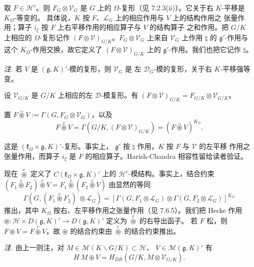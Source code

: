 取 $F\in\mathcal{H}^c$。则 $F_G\otimes\mathcal{V}_G$ 是 $G$ 上的
$\Omega$-复形（见 7.2.3(ii)）。它关于右 $K$-平移是 $K_\Omega$-等变的。
具体说，$K$ 按 $F$、$\mathcal{L}_G$ 上的相应作用与 $V$ 上的结构作用之
张量作用；算子 $i_\xi$ 按 $F$ 上右平移作用的相应算子与 $V$ 的结构算子
之和作用。把 $G/K$ 上相应的 $\Omega$-复形记作
$(F\otimes\mathcal{V})_{G/K}$。$F_G\otimes\mathcal{V}_G$ 上来自
$\mathcal{V}_G$ 上作用 $\natural$ 的 $\mathfrak{g}'$-作用与这个
$K_\Omega$-作用交换，故它定义了 $(F\otimes\mathcal{V})_{G/K}$ 上的
$\mathfrak{g}'$-作用。我们也把它记作 $\natural$。

\emph{注.} 若 $V$ 是 $(\mathfrak{g},K)'$-模的复形，则 $\mathcal{V}_G$ 是
左 $\mathcal{D}_G$-模的复形，关于右 $K$-平移强等变。


设 $\mathcal{V}_{G/K}$ 是 $G/K$ 上相应的左 $\mathcal{D}$-模复形。有
$(F\otimes\mathcal{V})_{G/K}=F_{G/K}\otimes\mathcal{V}_{G/K}$。

置 $F\overset{\sim}{\circledast}V:=
\Gamma(G,F_G\otimes\mathcal{V}_G)$，以及
\begin{equation}\tag{331}
F\overset{c}{\circledast}V=\Gamma(G/K,(F\otimes\mathcal{V})_{G/K})
=(F\overset{\sim}{\circledast}V)^{K_\Omega}.
\end{equation}

这是 $(\mathfrak{k}_\Omega\times\mathfrak{g},K)'$-复形。事实上，
$\mathfrak{g}'$ 按 $\natural$ 作用，$K$ 按 $F$ 与 $\mathcal{V}$ 的左平移
作用之张量作用，而算子 $i_\xi$ 是 $F$ 的相应算子。Harish-Chandra
相容性留给读者验证。

现在 $\overset{c}{\circledast}$ 定义了
$C(\mathfrak{k}_\Omega\times\mathfrak{g},K)'$ 上的
$\mathcal{H}^c$-模结构。事实上，结合约束
$(F_1\overset{c}{\circledast}F_2)\overset{c}{\circledast}V=
F_1\overset{c}{\circledast}(F_2\overset{c}{\circledast}V)$ 由显然的等同
\[
\Gamma(G,(F_1\overset{c}{\circledast}F_2)^{\cdot}\otimes\mathcal{L}_G)
=[\Gamma(G,F_1^{\cdot}\otimes\mathcal{L}_G)
\otimes\Gamma(G,F_2^{\cdot}\otimes\mathcal{L}_G)]^{K_\Omega}
\]
推出，其中 $K_\Omega$ 按右、左平移作用之张量作用（见 7.6.5）。我们把
Hecke 作用 $\circledast:\mathcal{H}\times D(\mathfrak{g},K)'\to
D(\mathfrak{g},K)'$ 定义为 $\overset{c}{\circledast}$ 的右导出函子。
若 $F$ 松，则 $F\circledast V=F\overset{c}{\circledast}V$，故
$\circledast$ 的结合约束由 $\overset{c}{\circledast}$ 的结合约束推出。

\emph{注.} 由上一则注，对
$M\in\mathcal{M}(K\backslash G/K)\subset\mathcal{H}$、
$V\in\mathcal{M}(\mathfrak{g},K)'$ 有
\begin{equation}\tag{332}
H^{\cdot}M\circledast V
=H_{DR}^{\cdot}(G/K,M\otimes\mathcal{V}_{G/K}).
\end{equation}

